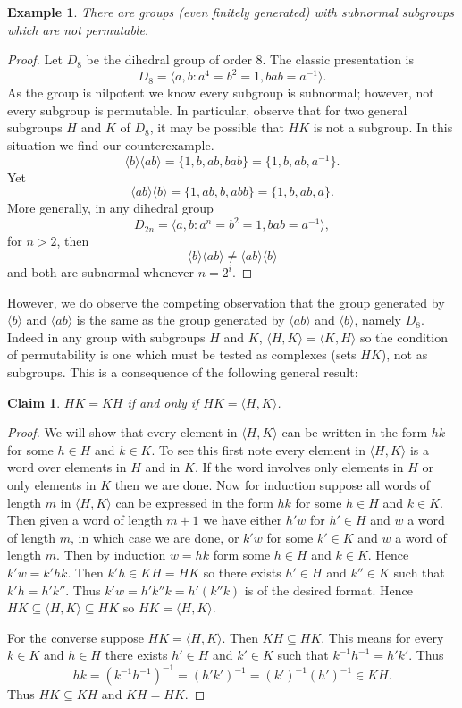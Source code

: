 \documentclass[12pt]{article}
\newtheorem{claim}{Claim}
\newtheorem{ex}[thm]{Example}
\begin{document}
\begin{ex}
There are groups (even finitely generated) with subnormal subgroups which are
not permutable.
\end{ex}
\begin{proof}
Let $D_8$ be the dihedral group of order 8.  The classic presentation is
\[D_8=\langle a,b : a^4=b^2=1, bab=a^{-1}\rangle.\]
As the group is nilpotent we know every subgroup is subnormal; however, not every subgroup is permutable.  In particular, observe that for two general subgroups $H$ and $K$ of $D_8$, it may be possible that $HK$ is not a subgroup.  In this situation we find our counterexample.
\[\langle b\rangle\langle ab\rangle=\{1,b,ab,bab\}=\{1,b,ab,a^{-1}\}.\]
Yet
\[\langle ab\rangle\langle b\rangle=\{1,ab,b,abb\}=\{1,b,ab,a\}.\]
More generally, in any dihedral group
\[D_{2n}=\langle a,b : a^n=b^2=1, bab=a^{-1}\rangle,\]
for $n>2$, then 
\[\langle b\rangle\langle ab\rangle\neq \langle ab\rangle\langle b\rangle\]
and both are subnormal whenever $n=2^i$.
\end{proof}

However, we do observe the competing observation that the group generated
by $\langle b\rangle$ and $\langle ab\rangle$ is the same as the group
generated by $\langle ab\rangle$ and $\langle b\rangle$, namely $D_8$.
Indeed in any group with subgroups $H$ and $K$, $\langle H,K\rangle=\langle K,H\rangle$ so the condition of permutability is one which must be tested as complexes (sets $HK$), not as subgroups.  This is a consequence of the following general result:

\begin{claim}
$HK=KH$ if and only if $HK=\langle H,K\rangle$.
\end{claim}
\begin{proof}
We will show that every element in $\langle H,K\rangle$ can be written in
the form $hk$ for some $h\in H$ and $k\in K$.  To see this first note
every element in $\langle H,K\rangle$ is a word over elements in $H$ and in 
$K$.  If the word involves only elements in $H$ or only elements in $K$ then
we are done. Now for induction suppose all words of length $m$ in $\langle H,K\rangle$ can be expressed in the form $hk$ for some $h\in H$ and $k\in K$.
Then given a word of length $m+1$ we have either $h'w$ for $h'\in H$ and $w$
a word of length $m$, in which case we are done, or $k'w$ for some $k'\in K$
and $w$ a word of length $m$.  Then by induction $w=hk$ form some $h\in H$ and
$k\in K$.  Hence $k'w=k'hk$.  Then $k'h\in KH=HK$ so there exists $h'\in H$ and $k''\in K$ such that $k'h=h'k''$.  Thus $k'w=h'k''k=h'(k''k)$ is of the 
desired format.  Hence $HK\subseteq \langle H,K\rangle\subseteq HK$ so 
$HK=\langle H,K\rangle$.

For the converse suppose $HK=\langle H,K\rangle$.  Then $KH\subseteq HK$.
This means for every $k\in K$ and $h\in H$ there exists $h'\in H$ and
$k'\in K$ such that $k^{-1}h^{-1}=h'k'$.  Thus 
\[hk=(k^{-1} h^{-1})^{-1}=(h' k')^{-1}=(k')^{-1}(h')^{-1}\in KH.\]
Thus $HK\subseteq KH$ and $KH=HK$.
\end{proof}
\end{document}
